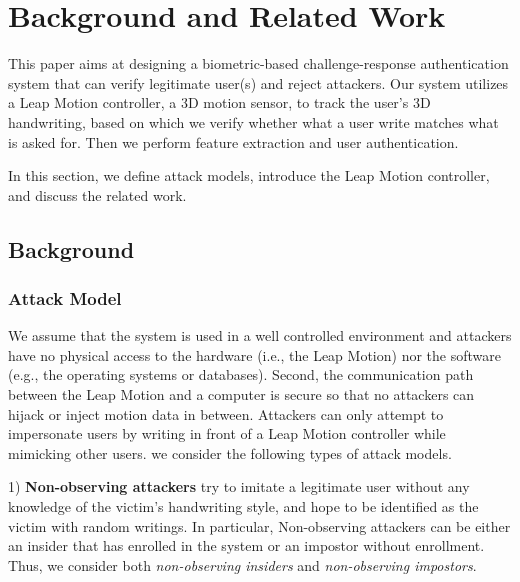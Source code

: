 \section{Background and Related Work}\label{sec:background}

This paper aims at designing a biometric-based challenge-response authentication system that can verify legitimate user(s) and reject attackers.
Our system utilizes a Leap Motion controller, a 3D motion sensor, to track the user's 3D handwriting, based on which we verify whether what a user write matches what is asked for. Then we perform feature extraction and user authentication. 

In this section, we define attack models, introduce the Leap Motion controller, and discuss the related work. 



\subsection{Background}
\label{sec:bg}

\subsubsection{Attack Model}
We assume that the system is used in a well controlled environment and attackers have no physical access to the hardware (i.e., the Leap Motion) nor the software (e.g., the operating systems or databases). Second, the communication path between the Leap Motion and a computer is secure so that no attackers can hijack or inject motion data in between. Attackers can only attempt to impersonate users by writing in front of a Leap Motion controller while mimicking other users. 
we consider the following  types of attack models. 

1) \textbf{Non-observing attackers} try to imitate a legitimate user without any knowledge of the victim's handwriting style, and hope to be identified as the victim with random writings. In particular, Non-observing attackers can be either an insider that has enrolled in the \CiT system or an impostor without enrollment.  Thus, we consider both \textit{non-observing insiders} and \textit{non-observing impostors}. 


